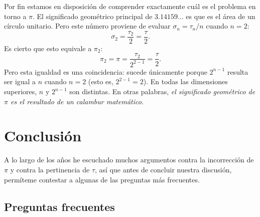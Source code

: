 Por fin estamos en disposición de comprender exactamente cuál es el problema en torno a $\pi$. El significado geométrico principal de $3.14159\ldots$ es que es el área de un círculo unitario. Pero este número proviene de evaluar $\sigma_n = \tau_n/n$ cuando $n=2$:
\[
\sigma_2 = \frac{\tau_2}{2} = \frac{\tau}{2}.
\]
Es cierto que esto equivale a $\pi_2$:
\[
\pi_2 = \pi = \frac{\tau_2}{2^{2-1}} = \frac{\tau}{2}.
\]
Pero esta igualdad es una coincidencia: sucede únicamente porque $2^{n-1}$ resulta ser igual a $n$ cuando $n=2$ (esto es, $2^{2-1} = 2$). En todas las dimensiones superiores, $n$ y $2^{n-1}$ son distintas. En otras palabras, \emph{el significado geométrico de $\pi$ es el resultado de un calambur matemático}.



\section{Conclusión}
\label{sec:conclusion}

A lo largo de los años he escuchado muchos argumentos contra la incorrección de $\pi$ y contra la pertinencia de $\tau$, así que antes de concluir nuestra discusión, permíteme contestar a algunas de las preguntas más frecuentes.

  \subsection{Preguntas frecuentes} %
  \label{sec:faq}

